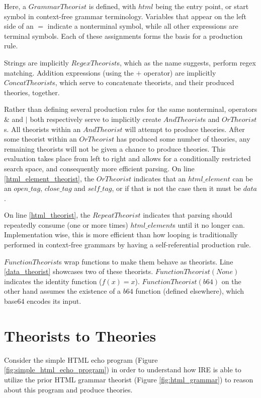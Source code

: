 Here, a $GrammarTheorist$ is defined, with $html$ being the entry point, or start symbol in context-free grammar terminology.
Variables that appear on the left side of an $=$ indicate a nonterminal symbol, while all other expressions are terminal symbols.
Each of these assignments forms the basis for a production rule.

Strings are implicitly $RegexTheorist$s, which as the name suggests, perform regex matching.
Addition expressions (using the $+$ operator) are implicitly $ConcatTheorist$s, which serve to concatenate theorists, and their produced theories, together.

Rather than defining several production rules for the same nonterminal, operators $\&$ and $|$ both respectively serve to implicitly create $AndTheorist$s and $OrTheorist$s.
All theorists within an $AndTheorist$ will attempt to produce theories.
After some theorist within an $OrTheorist$ has produced some number of theories, any remaining theorists will not be given a chance to produce theories.
This evaluation takes place from left to right and allows for a conditionally restricted search space, and consequently more efficient parsing.
On line \ref{html_element_theorist}, the $OrTheorist$ indicates that an $html\_element$ can be an $open\_tag$, $close\_tag$ and $self\_tag$, or if that is not the case then it must be $data$.

On line \ref{html_theorist}, the $RepeatTheorist$ indicates that parsing should repeatedly consume (one or more times) $html\_element$s until it no longer can.
Implementation wise, this is more efficient than how looping is traditionally performed in context-free grammars by having a self-referential production rule.

$FunctionTheorist$s wrap functions to make them behave as theorists.
Line \ref{data_theorist} showcases two of these theorists.
$FunctionTheorist(None)$ indicates the identity function ($f(x)=x$).
$FunctionTheorist(b64)$ on the other hand assumes the existence of a $b64$ function (defined elsewhere), which base64 encodes its input.


\section{Theorists to Theories}

Consider the simple HTML echo program (Figure \ref{fig:simple_html_echo_program}) in order to understand how IRE is able to utilize the prior HTML grammar theorist (Figure \ref{fig:html_grammar}) to reason about this program and produce theories.

